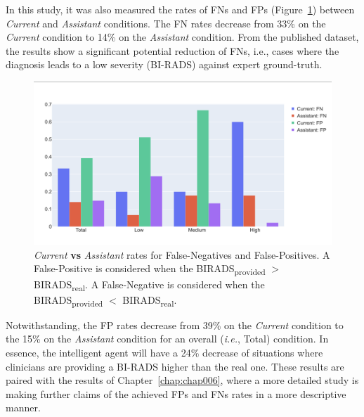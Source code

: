 In this study, it was also measured the rates of \acp{FN} and \acp{FP} (Figure~\ref{fig:fig038}) between {\it Current} and {\it Assistant} conditions.
The \ac{FN} rates decrease from 33\% on the {\it Current} condition to 14\% on the {\it Assistant} condition.
From the published dataset\footnotemark[29], the results show a significant potential reduction of \acp{FN}, i.e., cases where the diagnosis leads to a low severity (\ac{BI-RADS}) against expert ground-truth.


\begin{figure}[ht]
\centering
\includegraphics[width=\columnwidth]{images/fig038}
\caption{{\it Current} {\bf vs} {\it Assistant} rates for False-Negatives and False-Positives. A False-Positive is considered when the BIRADS\textsubscript{provided} $>$ BIRADS\textsubscript{real}. A False-Negative is considered when the BIRADS\textsubscript{provided} $<$ BIRADS\textsubscript{real}.}
\label{fig:fig038}
\end{figure}

Notwithstanding, the \ac{FP} rates decrease from 39\% on the {\it Current} condition to the 15\% on the {\it Assistant} condition for an overall ({\it i.e.}, Total) condition.
In essence, the intelligent agent will have a 24\% decrease of situations where clinicians are providing a \ac{BI-RADS} higher than the real one.
These results are paired with the results of Chapter~\ref{chap:chap006}, where a more detailed study is making further claims of the achieved \acp{FP} and \acp{FN} rates in a more descriptive manner.

